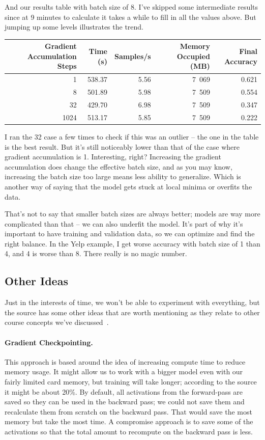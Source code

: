 And our results table with batch size of 8. I've skipped some intermediate results since at 9 minutes to calculate it takes a while to fill in all the values above. But jumping up some levels illustrates the trend.

\begin{center}
\begin{tabular}{r|r|r|r|r}
\textbf{Gradient Accumulation Steps} & \textbf{Time (s)} & \textbf{Samples/s} & \textbf{Memory Occupied (MB)} & \textbf{Final Accuracy}\\ \hline
1 & 538.37 & 5.56 & 7~069 & 0.621 \\
8 & 501.89 & 5.98 & 7~509 & 0.554 \\
32 & 429.70 & 6.98 & 7~509 & 0.347 \\
1024 & 513.17 & 5.85 & 7~509 & 0.222 \\
\end{tabular}
\end{center}

I ran the 32 case a few times to check if this was an outlier -- the one in the table is the best result. But it's still noticeably lower than that of the case where gradient accumulation is 1. Interesting, right? Increasing the gradient accumulation does change the effective batch size, and as you may know, increasing the batch size too large means less ability to generalize. Which is another way of saying that the model gets stuck at local minima or overfits the data.

That's not to say that smaller batch sizes are always better; models are way more complicated than that -- we can also underfit the model. It's part of why it's important to have training and validation data, so we can optimize and find the right balance. In the Yelp example, I get worse accuracy with batch size of 1 than 4, and 4 is worse than 8. There really is no magic number.

\subsection*{Other Ideas}
Just in the interests of time, we won't be able to experiment with everything, but the source has some other ideas that are worth mentioning as they relate to other course concepts we've discussed~\cite{hf}.

\paragraph{Gradient Checkpointing.} This approach is based around the idea of increasing compute time to reduce memory usage. It might allow us to work with a bigger model even with our fairly limited card memory, but training will take longer; according to the source it might be about 20\%. By default, all activations from the forward-pass are saved so they can be used in the backward pass; we could not save them and recalculate them from scratch on the backward pass. That would save the most memory but take the most time. A compromise approach is to save some of the activations so that the total amount to recompute on the backward pass is less. 

